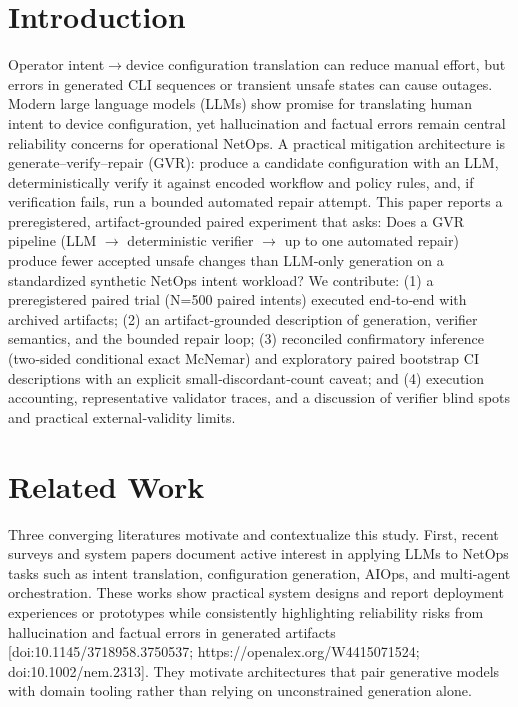 \documentclass[conference]{IEEEtran}
\begin{document}
\section{Introduction}
Operator intent\ensuremath{\rightarrow}device configuration translation can reduce manual effort, but errors in generated CLI sequences or transient unsafe states can cause outages. Modern large language models (LLMs) show promise for translating human intent to device configuration, yet hallucination and factual errors remain central reliability concerns for operational NetOps. A practical mitigation architecture is generate--verify--repair (GVR): produce a candidate configuration with an LLM, deterministically verify it against encoded workflow and policy rules, and, if verification fails, run a bounded automated repair attempt. This paper reports a preregistered, artifact‑grounded paired experiment that asks: Does a GVR pipeline (LLM \ensuremath{\rightarrow} deterministic verifier \ensuremath{\rightarrow} up to one automated repair) produce fewer accepted unsafe changes than LLM‑only generation on a standardized synthetic NetOps intent workload? We contribute: (1) a preregistered paired trial (N=500 paired intents) executed end‑to‑end with archived artifacts; (2) an artifact‑grounded description of generation, verifier semantics, and the bounded repair loop; (3) reconciled confirmatory inference (two‑sided conditional exact McNemar) and exploratory paired bootstrap CI descriptions with an explicit small‑discordant‑count caveat; and (4) execution accounting, representative validator traces, and a discussion of verifier blind spots and practical external‑validity limits.

\section{Related Work}
Three converging literatures motivate and contextualize this study. First, recent surveys and system papers document active interest in applying LLMs to NetOps tasks such as intent translation, configuration generation, AIOps, and multi‑agent orchestration. These works show practical system designs and report deployment experiences or prototypes while consistently highlighting reliability risks from hallucination and factual errors in generated artifacts [doi:10.1145/3718958.3750537; https://openalex.org/W4415071524; doi:10.1002/nem.2313]. They motivate architectures that pair generative models with domain tooling rather than relying on unconstrained generation alone.
\end{document}
